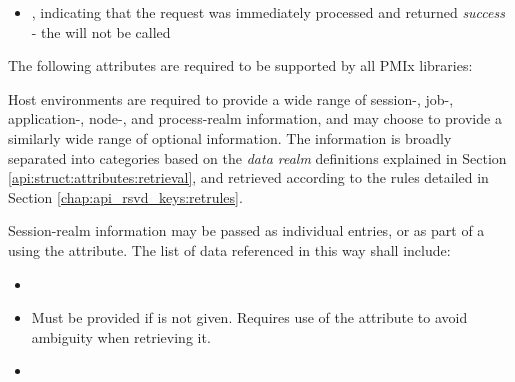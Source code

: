 \begin{arglist}
\end{arglist}

\returnsimplenb

\returnstart
\begin{itemize}
    \item {}, indicating that the request was immediately processed and returned \textit{success} - the  will not be called
\end{itemize}
\returnend

\reqattrstart
The following attributes are required to be supported by all \ac{PMIx} libraries:


\divider

Host environments are required to provide a wide range of session-, job-, application-, node-, and process-realm information, and may choose to provide a similarly wide range of optional information. The information is broadly separated into categories based on the \emph{data realm} definitions explained in Section \ref{api:struct:attributes:retrieval}, and retrieved according to the rules detailed in Section \ref{chap:api_rsvd_keys:retrules}.

Session-realm information may be passed as individual  entries, or as part of a  using the  attribute. The list of data referenced in this way shall include:

\begin{itemize}
    \item {}
    \item {}Must be provided if  is not given. Requires use of the  attribute to avoid ambiguity when retrieving it.
    \pasteAttributeItemEnd
    \item {}
\end{itemize}

